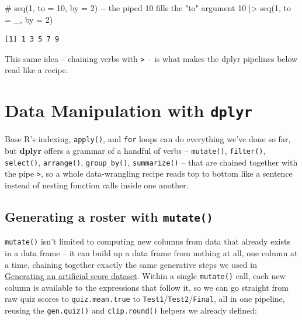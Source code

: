 \documentclass[
  letterpaper,
  DIV=11,
  numbers=noendperiod]{scrreprt}
\newenvironment{Shaded}{\begin{snugshade}}{\end{snugshade}}
\newcommand{\AttributeTok}[1]{\textcolor[rgb]{0.40,0.45,0.13}{#1}}
\newcommand{\CommentTok}[1]{\textcolor[rgb]{0.37,0.37,0.37}{#1}}
\newcommand{\DecValTok}[1]{\textcolor[rgb]{0.68,0.00,0.00}{#1}}
\newcommand{\FunctionTok}[1]{\textcolor[rgb]{0.28,0.35,0.67}{#1}}
\newcommand{\NormalTok}[1]{\textcolor[rgb]{0.00,0.23,0.31}{#1}}
\newcommand{\SpecialCharTok}[1]{\textcolor[rgb]{0.37,0.37,0.37}{#1}}
\begin{document}
\begin{Shaded}
\begin{Highlighting}[]
\CommentTok{\# seq(1, to = 10, by = 2) {-}{-} the piped 10 fills the "to" argument}
\DecValTok{10} \SpecialCharTok{|\textgreater{}} \FunctionTok{seq}\NormalTok{(}\DecValTok{1}\NormalTok{, }\AttributeTok{to =}\NormalTok{ \_, }\AttributeTok{by =} \DecValTok{2}\NormalTok{)}
\end{Highlighting}
\end{Shaded}

\begin{verbatim}
[1] 1 3 5 7 9
\end{verbatim}

This same idea -- chaining verbs with \texttt{\textbar{}\textgreater{}}
-- is what makes the dplyr pipelines below read like a recipe.

\section{\texorpdfstring{Data Manipulation with
\texttt{dplyr}}{Data Manipulation with dplyr}}\label{data-manipulation-with-dplyr}

Base R's indexing, \texttt{apply()}, and \texttt{for} loops can do
everything we've done so far, but \textbf{dplyr} offers a grammar of a
handful of verbs -- \texttt{mutate()}, \texttt{filter()},
\texttt{select()}, \texttt{arrange()}, \texttt{group\_by()},
\texttt{summarize()} -- that are chained together with the pipe
\texttt{\textbar{}\textgreater{}}, so a whole data-wrangling recipe
reads top to bottom like a sentence instead of nesting function calls
inside one another.

\subsection{\texorpdfstring{Generating a roster with
\texttt{mutate()}}{Generating a roster with mutate()}}\label{generating-a-roster-with-mutate}

\texttt{mutate()} isn't limited to computing new columns from data that
already exists in a data frame -- it can build up a data frame from
nothing at all, one column at a time, chaining together exactly the same
generative steps we used in
\hyperref[generating-an-artificial-score-dataset]{Generating an
artificial score dataset}. Within a single \texttt{mutate()} call, each
new column is available to the expressions that follow it, so we can go
straight from raw quiz scores to \texttt{quiz.mean.true} to
\texttt{Test1}/\texttt{Test2}/\texttt{Final}, all in one pipeline,
reusing the \texttt{gen.quiz()} and \texttt{clip.round()} helpers we
already defined:
\end{document}
